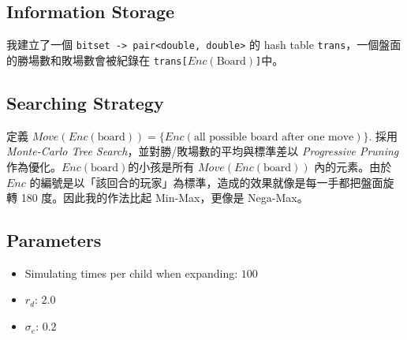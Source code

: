 \documentclass[12pt,a4paper]{article}
\begin{document}
    \subsection{Information Storage}
        我建立了一個 \texttt{bitset -> pair<double, double>} 的 hash table \texttt{trans}，一個盤面的勝場數和敗場數會被紀錄在 \texttt{trans[}\(Enc(\text{Board})\)\texttt{]}中。
    \subsection{Searching Strategy}
        定義 \(Move(Enc(\text{board}))=\{Enc(\text{all possible board after one move})\}\).
        採用 \textit{Monte-Carlo Tree Search}，並對勝/敗場數的平均與標準差以 \textit{Progressive Pruning} 作為優化。\(Enc(\text{board})\)的小孩是所有 \(Move(Enc(\text{board}))\) 內的元素。由於 \(Enc\) 的編號是以「該回合的玩家」為標準，造成的效果就像是每一手都把盤面旋轉 180 度。因此我的作法比起 Min-Max，更像是 Nega-Max。
    \subsection{Parameters}
    \begin{itemize}
        \item Simulating times per child when expanding: \(100\)
        \item \(r_d\): \(2.0\)
        \item \(\sigma_e\): \(0.2\)
    \end{itemize}
\end{document}
